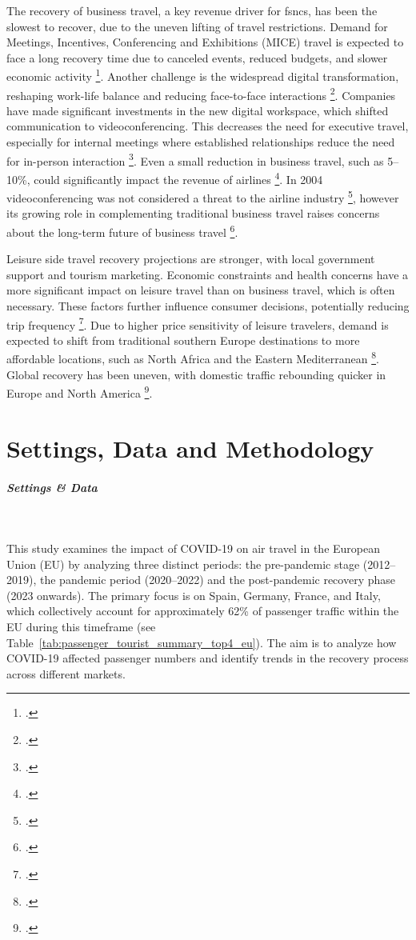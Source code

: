 \documentclass[12pt,onehalfspacing,headsepline,oneside,openright,a4paper, fleqn]{report}
\begin{document}
The recovery of business travel, a key revenue driver for \gls{fsncs}, has been the slowest to recover, due to the uneven lifting of travel restrictions. Demand for Meetings, Incentives, Conferencing and Exhibitions (MICE) travel is expected to face a long recovery time due to canceled events, reduced budgets, and slower economic activity \footcite[4-5]{suau2020}. Another challenge is the widespread digital transformation, reshaping work-life balance and reducing face-to-face interactions \footcite{schwarzmuller2018}. Companies have made significant investments in the new digital workspace, which shifted communication to videoconferencing. This decreases the need for executive travel, especially for internal meetings where established relationships reduce the need for in-person interaction \footcite{denstadli2013}. Even a small reduction in business travel, such as 5–10\%, could significantly impact the revenue of airlines \footcite{denstadli2013}. In 2004 videoconferencing was not considered a threat to the airline industry \footcite{denstadli2004}, however its growing role in complementing traditional business travel raises concerns about the long-term future of business travel \footcite[5]{suau2020}.

Leisure side travel recovery projections are stronger, with local government support and tourism marketing. Economic constraints and health concerns have a more significant impact on leisure travel than on business travel, which is often necessary. These factors further influence consumer decisions, potentially reducing trip frequency \footcite[5]{suau2020}. Due to higher price sensitivity of leisure travelers, demand is expected to shift from traditional southern Europe destinations to more affordable locations, such as North Africa and the Eastern Mediterranean \footcite{morlotti2017}. Global recovery has been uneven, with domestic traffic rebounding quicker in Europe and North America \footcite[144-147]{sun2023}.


\chapter{Settings, Data and Methodology}

\paragraph{Settings \& Data}
\

This study examines the impact of COVID-19 on air travel in the European Union (EU) by analyzing three distinct periods: the pre-pandemic stage (2012–2019), the pandemic period (2020–2022) and the post-pandemic recovery phase (2023 onwards). The primary focus is on Spain, Germany, France, and Italy, which collectively account for approximately 62\% of passenger traffic within the EU during this timeframe (see Table~\ref{tab:passenger_tourist_summary_top4_eu}). The aim is to analyze how COVID-19 affected passenger numbers and identify trends in the recovery process across different markets.
\end{document}
